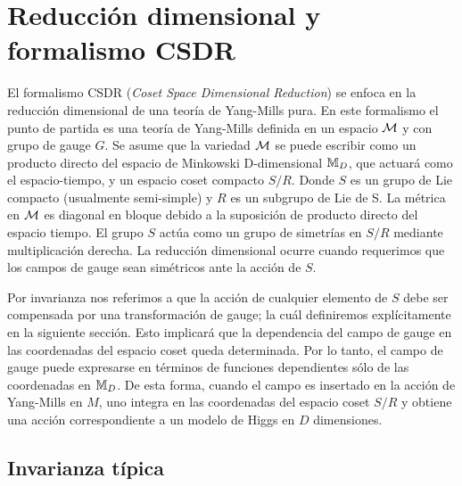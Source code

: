

\section{Reducción dimensional y formalismo CSDR}

El formalismo CSDR (\emph{Coset Space Dimensional Reduction}) se enfoca en la reducción dimensional de una teoría de Yang-Mills pura. En este formalismo el punto de partida es una teoría de Yang-Mills definida en un espacio $\mathcal{M}$ y con grupo de gauge $G$. Se asume que la variedad $\mathcal{M}$ se puede escribir como un producto directo del espacio de Minkowski D-dimensional $\mathbb{M}_D$, que actuará como el espacio-tiempo, y un espacio coset compacto $S/R$. Donde $S$ es un grupo de Lie compacto (usualmente semi-simple) y $R$ es un subgrupo de Lie de S. La métrica en $\mathcal{M}$ es diagonal en bloque debido a la suposición de producto directo del espacio tiempo. El grupo $S$ actúa como un grupo de simetrías en $S/R$ mediante multiplicación derecha. La reducción dimensional ocurre cuando requerimos que los campos de gauge sean simétricos ante la acción de $S$. 

Por invarianza nos referimos a que la acción de cualquier elemento de $S$ debe ser compensada por una transformación de gauge; la cuál definiremos explícitamente en la siguiente sección. Esto implicará que la dependencia del campo de gauge en las coordenadas del espacio coset queda determinada. Por lo tanto, el campo de gauge puede expresarse en términos de funciones dependientes sólo de las coordenadas en $\mathbb{M}_D$. De esta forma, cuando el campo es insertado en la acción de Yang-Mills en $M$, uno integra en las coordenadas del espacio coset $S/R$ y obtiene una acción correspondiente a un modelo de Higgs en $D$ dimensiones.

\subsection{Invarianza típica}

